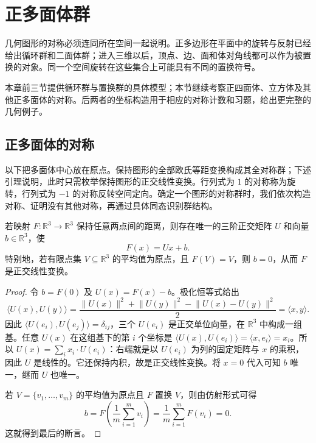
\section{正多面体群}
\label{b1:sec:0304}

%
%
%

几何图形的对称必须连同所在空间一起说明。正多边形在平面中的旋转与反射已经给出循环群和二面体群；进入三维以后，顶点、边、面和体对角线都可以作为被置换的对象。同一个空间旋转在这些集合上可能具有不同的置换符号。

\ProseParagraphBreak
本章前三节提供循环群与置换群的具体模型；本节继续考察正四面体、立方体及其他正多面体的对称。后两者的坐标构造用于相应的对称计数和习题，给出更完整的几何例子。

\subsection{正多面体的对称}
\label{b1:subsec:0304:geometry}

以下把多面体中心放在原点。保持图形的全部欧氏等距变换构成其全对称群；下述引理说明，此时只需枚举保持图形的正交线性变换。行列式为 \(1\) 的对称称为旋转，行列式为 \(-1\) 的对称反转空间定向。确定一个图形的对称群时，我们依次构造对称、证明没有其他对称，再通过具体同态识别群结构。

\begin{lemma}[欧氏等距变换的标准形式]\label{b1:lem:euclidean-isometry-affine}
	若映射 \(F\colon\mathbb R^3\to\mathbb R^3\) 保持任意两点间的距离，则存在唯一的三阶正交矩阵 \(U\) 和向量 \(b\in\mathbb R^3\)，使
	\[
		F(x)=Ux+b.
	\]
	特别地，若有限点集 \(V\subseteq\mathbb R^3\) 的平均值为原点，且 \(F(V)=V\)，则 \(b=0\)，从而 \(F\) 是正交线性变换。
\end{lemma}
\begin{proof}
	令 \(b=F(0)\) 及 \(U(x)=F(x)-b\)。极化恒等式给出
	\[
		\langle U(x),U(y)\rangle =\frac{\lVert U(x)\rVert^2+\lVert U(y)\rVert^2 -\lVert U(x)-U(y)\rVert^2}{2} =\langle x,y\rangle.
	\]
	因此 \(\langle U(e_i),U(e_j)\rangle=\delta_{ij}\)，三个 \(U(e_i)\) 是正交单位向量，在 \(\mathbb R^3\) 中构成一组基。任意 \(U(x)\) 在这组基下的第 \(i\) 个坐标是 \(\langle U(x),U(e_i)\rangle=\langle x,e_i\rangle=x_i\)。所以 \(U(x)=\sum_i x_i\cdot U(e_i)\)：右端就是以 \(U(e_i)\) 为列的固定矩阵与 \(x\) 的乘积，因此 \(U\) 是线性的。它还保持内积，故是正交线性变换。将 \(x=0\) 代入可知 \(b\) 唯一，继而 \(U\) 也唯一。

	若 \(V=\{v_1,\ldots,v_m\}\) 的平均值为原点且 \(F\) 置换 \(V\)，则由仿射形式可得
	\[
		b=F\left(\frac1m\sum_{i=1}^m v_i\right) =\frac1m\sum_{i=1}^m F(v_i)=0.
	\]
	这就得到最后的断言。
\end{proof}

